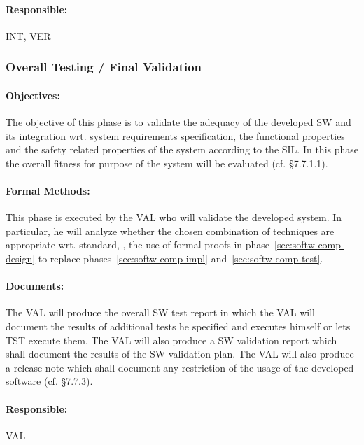 \paragraph{Responsible:}
\label{sec:sw-int-responsible}
INT, VER

\subsubsection{Overall Testing / Final Validation}
\label{sec:overall-testing-}

\paragraph{Objectives:}
\label{sec:sw-test-objectives}
The objective of this phase is to validate the adequacy of the developed SW and
its integration wrt. system requirements specification, the functional
properties and the safety related properties of the system according to the
SIL. In this phase the overall fitness for purpose of the system will be
evaluated (cf. §7.7.1.1).

\paragraph{Formal Methods:}
\label{sec:sw-test-formal-methods}
This phase is executed by the VAL who will validate the developed system. In
particular, he will analyze whether the chosen combination of techniques are
appropriate wrt. standard, \eg, the use of formal proofs in
phase~\ref{sec:softw-comp-design} to replace phases~\ref{sec:softw-comp-impl}
and~\ref{sec:softw-comp-test}.

\paragraph{Documents:}
\label{sec:sw-test-documents}
The VAL will produce the overall SW test report in which the VAL will document
the results of additional tests he specified and executes himself or lets TST
execute them. The VAL will also produce a SW validation report which shall
document the results of the SW validation plan. The VAL will also produce a
release note which shall document any restriction of the usage of the developed
software (cf. §7.7.3).

\paragraph{Responsible:}
\label{sec:sw-test-responsible}
VAL


